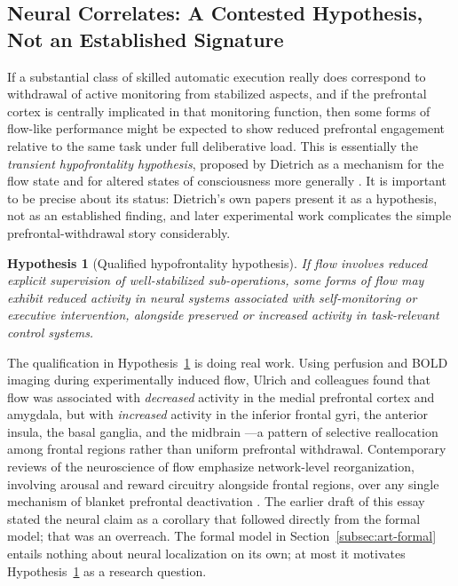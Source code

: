 \documentclass[12pt, a4paper]{article}
\theoremstyle{plain}
\newtheorem{hypothesis}[proposition]{Hypothesis}
\theoremstyle{definition}
\theoremstyle{remark}
\begin{document}
\subsection{Neural Correlates: A Contested Hypothesis, Not an Established Signature}
\label{subsec:hypofrontality}

If a substantial class of skilled automatic execution really does correspond to withdrawal of active monitoring from stabilized aspects, and if the prefrontal cortex is centrally implicated in that monitoring function, then some forms of flow-like performance might be expected to show reduced prefrontal engagement relative to the same task under full deliberative load. This is essentially the \emph{transient hypofrontality hypothesis}, proposed by Dietrich as a mechanism for the flow state and for altered states of consciousness more generally \cite{dietrich2003,dietrich2004}. It is important to be precise about its status: Dietrich's own papers present it as a hypothesis, not as an established finding, and later experimental work complicates the simple prefrontal-withdrawal story considerably.

\begin{hypothesis}[Qualified hypofrontality hypothesis]
\label{hyp:hypofrontality}
If flow involves reduced explicit supervision of well-stabilized sub-operations, some forms of flow may exhibit reduced activity in neural systems associated with self-monitoring or executive intervention, alongside preserved or increased activity in task-relevant control systems.
\end{hypothesis}

The qualification in Hypothesis~\ref{hyp:hypofrontality} is doing real work. Using perfusion and BOLD imaging during experimentally induced flow, Ulrich and colleagues found that flow was associated with \emph{decreased} activity in the medial prefrontal cortex and amygdala, but with \emph{increased} activity in the inferior frontal gyri, the anterior insula, the basal ganglia, and the midbrain \cite{ulrich2014,ulrich2016}---a pattern of selective reallocation among frontal regions rather than uniform prefrontal withdrawal. Contemporary reviews of the neuroscience of flow emphasize network-level reorganization, involving arousal and reward circuitry alongside frontal regions, over any single mechanism of blanket prefrontal deactivation \cite{vanderlinden2021}. The earlier draft of this essay stated the neural claim as a corollary that followed directly from the formal model; that was an overreach. The formal model in Section~\ref{subsec:art-formal} entails nothing about neural localization on its own; at most it motivates Hypothesis~\ref{hyp:hypofrontality} as a research question.
\end{document}
